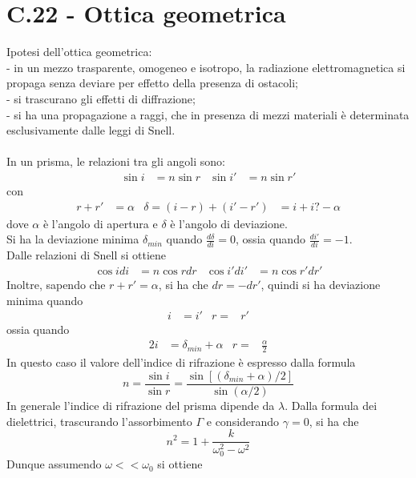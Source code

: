 \documentclass{article}
\begin{document}
\section*{C.22 - Ottica geometrica}
Ipotesi dell'ottica geometrica:\\
- in un mezzo trasparente, omogeneo e isotropo, la radiazione elettromagnetica si propaga senza deviare per effetto della presenza di ostacoli;\\
- si trascurano gli effetti di diffrazione;\\
- si ha una propagazione a raggi, che in presenza di mezzi materiali è determinata esclusivamente dalle leggi di Snell.\\
\\
In un prisma, le relazioni tra gli angoli sono:
\begin{align*}
    \sin i&=n\sin r & \sin i'&=n\sin r'
\end{align*}
con
\begin{align*}
    r+r'&=\alpha & \delta=(i-r)+(i'-r')&=i+i?-\alpha
\end{align*}
dove $\alpha$ è l'angolo di apertura e $\delta$ è l'angolo di deviazione.\\
Si ha la deviazione minima $\delta_{min}$ quando $\frac{d\delta}{di}=0$, ossia quando $\frac{di'}{di}=-1$.\\
Dalle relazioni di Snell si ottiene
\begin{align*}
    \cos idi&=n\cos rdr & \cos i'di'&=n\cos r'dr'
\end{align*}
Inoltre, sapendo che $r+r'=\alpha$, si ha che $dr=-dr'$, quindi si ha deviazione minima quando
\begin{align*}
    i&=i' & r=&r'
\end{align*}
ossia quando
\begin{align*}
    2i&=\delta_{min}+\alpha & r=&\frac{\alpha}{2}
\end{align*}
In questo caso il valore dell'indice di rifrazione è espresso dalla formula
\begin{equation}
    n=\frac{\sin i}{\sin r}= \frac{\sin [(\delta_{min}+\alpha)/2]}{\sin (\alpha/2)}
    \nonumber
\end{equation}
In generale l’indice di rifrazione del prisma dipende da $\lambda$. Dalla formula dei dielettrici, trascurando l’assorbimento $\Gamma$ e considerando $\gamma=0$, si ha che
\begin{equation}
    n^2=1+\frac{k}{\omega_0^2-\omega^2}
    \nonumber
\end{equation}
Dunque assumendo $\omega<<\omega_0$ si ottiene 
\end{document}

